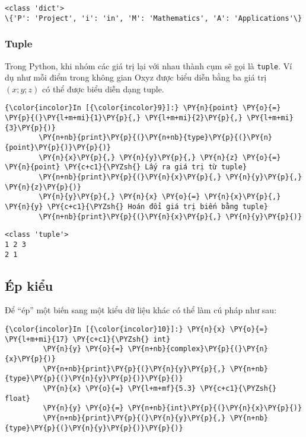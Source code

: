     \begin{Verbatim}[commandchars=\\\{\}]
<class 'dict'>
\{'P': 'Project', 'i': 'in', 'M': 'Mathematics', 'A': 'Applications'\}

    \end{Verbatim}

    \subsubsection{Tuple}\label{tuple}

Trong Python, khi nhóm các giá trị lại với nhau thành cụm sẽ gọi là
\texttt{tuple}. Ví dụ như mỗi điểm trong không gian Oxyz được biểu diễn
bằng ba giá trị \((x; y; z)\) có thể được biểu diễn dạng tuple.

    
\begin{Verbatim}[commandchars=\\\{\}]
{\color{incolor}In [{\color{incolor}9}]:} \PY{n}{point} \PY{o}{=} \PY{p}{(}\PY{l+m+mi}{1}\PY{p}{,} \PY{l+m+mi}{2}\PY{p}{,} \PY{l+m+mi}{3}\PY{p}{)}
        \PY{n+nb}{print}\PY{p}{(}\PY{n+nb}{type}\PY{p}{(}\PY{n}{point}\PY{p}{)}\PY{p}{)}
        \PY{n}{x}\PY{p}{,} \PY{n}{y}\PY{p}{,} \PY{n}{z} \PY{o}{=} \PY{n}{point} \PY{c+c1}{\PYZsh{} Lấy ra giá trị từ tuple}
        \PY{n+nb}{print}\PY{p}{(}\PY{n}{x}\PY{p}{,} \PY{n}{y}\PY{p}{,} \PY{n}{z}\PY{p}{)}
        \PY{n}{y}\PY{p}{,} \PY{n}{x} \PY{o}{=} \PY{n}{x}\PY{p}{,} \PY{n}{y} \PY{c+c1}{\PYZsh{} Hoán đổi giá trị biến bằng tuple}
        \PY{n+nb}{print}\PY{p}{(}\PY{n}{x}\PY{p}{,} \PY{n}{y}\PY{p}{)}
\end{Verbatim}
    

    \begin{Verbatim}[commandchars=\\\{\}]
<class 'tuple'>
1 2 3
2 1

    \end{Verbatim}

    \subsection{Ép kiểu}\label{uxe9p-kiux1ec3u}

    Để ``ép'' một biến sang một kiểu dữ liệu khác có thể làm cú pháp như
sau:

    
\begin{Verbatim}[commandchars=\\\{\}]
{\color{incolor}In [{\color{incolor}10}]:} \PY{n}{x} \PY{o}{=} \PY{l+m+mi}{17} \PY{c+c1}{\PYZsh{} int}
         \PY{n}{y} \PY{o}{=} \PY{n+nb}{complex}\PY{p}{(}\PY{n}{x}\PY{p}{)}
         \PY{n+nb}{print}\PY{p}{(}\PY{n}{y}\PY{p}{,} \PY{n+nb}{type}\PY{p}{(}\PY{n}{y}\PY{p}{)}\PY{p}{)}
         \PY{n}{x} \PY{o}{=} \PY{l+m+mf}{5.3} \PY{c+c1}{\PYZsh{} float}
         \PY{n}{y} \PY{o}{=} \PY{n+nb}{int}\PY{p}{(}\PY{n}{x}\PY{p}{)}
         \PY{n+nb}{print}\PY{p}{(}\PY{n}{y}\PY{p}{,} \PY{n+nb}{type}\PY{p}{(}\PY{n}{y}\PY{p}{)}\PY{p}{)}
\end{Verbatim}
    

